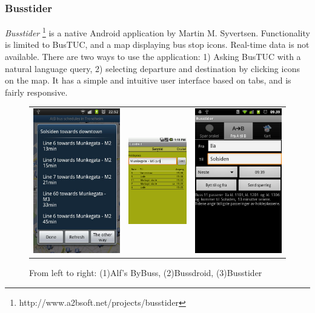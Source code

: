 \subsubsection{Busstider}
\emph{Busstider} \footnote{http://www.a2bsoft.net/projects/busstider} is a native Android application by Martin M. Syvertsen. Functionality is limited to BusTUC, and a map displaying bus stop icons. Real-time data is not available. There are two ways to use the application: 1) Asking BusTUC with a natural language query, 2) selecting departure and destination by clicking icons on the map. It has a simple and intuitive user interface based on tabs, and is fairly responsive.
\begin{figure}[!h]
\begin{tabular}{ccc}
\includegraphics[width=0.27\linewidth]{ExistingSolutions/alfsbybuss.jpg} & 
\includegraphics[width=0.27\linewidth]{ExistingSolutions/bussdroid.png} &
\includegraphics[width=0.27\linewidth]{ExistingSolutions/busstider.jpg}\\
\end{tabular}
\caption{From left to right: (1)Alf's ByBuss, (2)Bussdroid, (3)Busstider}
\end{figure}
\newpage
